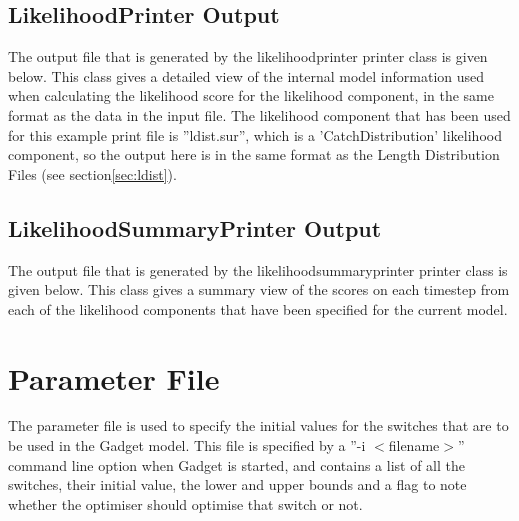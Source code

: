 \documentclass[10pt,twoside]{article}
\begin{document}
{\small }

\subsection{LikelihoodPrinter Output}
The output file that is generated by the likelihoodprinter printer class is given below.  This class gives a detailed view of the internal model information used when calculating the likelihood score for the likelihood component, in the same format as the data in the input file.  The likelihood component that has been used for this example print file is ''ldist.sur'', which is a 'CatchDistribution' likelihood component, so the output here is in the same format as the Length Distribution Files (see section\ref{sec:ldist}).

{\small }

\subsection{LikelihoodSummaryPrinter Output}
The output file that is generated by the likelihoodsummaryprinter printer class is given below.  This class gives a summary view of the scores on each timestep from each of the likelihood components that have been specified for the current model.

{\small }

\section{Parameter File}
The parameter file is used to specify the initial values for the switches that are to be used in the Gadget model.  This file is specified by a ''-i $<$filename$>$'' command line option when Gadget is started, and  contains a list of all the switches, their initial value, the lower and upper bounds and a flag to note whether the optimiser should optimise that switch or not.

{\small }
\end{document}

